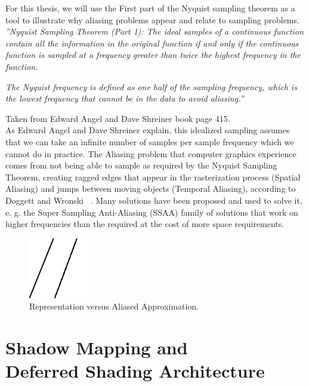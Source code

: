 \documentclass{cslthse-msc}
\begin{document}
For this thesis, we will use the First part of the Nyquist sampling theorem as a tool to illustrate why aliasing problems appear and relate to sampling problems. \\

\emph{''Nyquist Sampling Theorem (Part 1): The ideal samples of a continuous function contain all the information in the original function if and only if the continuous function is sampled at a frequency greater than twice the highest frequency in the function.}

\emph{The Nyquist frequency is defined as one half of the sampling frequency, which is the lowest frequency that cannot be in the data to avoid aliasing.''
}

Taken from Edward Angel and Dave Shreiner book page 415. \cite{Shreiner2011} \\

As Edward Angel and Dave Shreiner explain, this idealized sampling assumes that we can take an infinite number of samples per sample frequency which we cannot do in practice. The Aliasing problem that computer graphics experience comes from not being able to sample as required by the Nyquist Sampling Theorem, creating ragged edges that appear in the rasterization process (Spatial Aliasing) and jumps between moving objects (Temporal Aliasing), according to Doggett and Wronski  ~\cite{Doggett2017EDAN35,Wronski2014}. Many solutions have been proposed and used to solve it, e. g. the Super Sampling Anti-Aliasing (SSAA) family of solutions that work on higher frequencies than the required at the cost of more space requirements. 

\begin{figure}[!hbt]
	\centering
	\includegraphics[scale=1.0]{images/aliasing_example.png} 
	\caption{Representation versus Aliased Approximation.}\label{fig:aliasingexample}
\end{figure}

\section[Shadow Mapping and Deferred Shading Architecture]{Shadow Mapping and \\ Deferred Shading Architecture}
\end{document}
